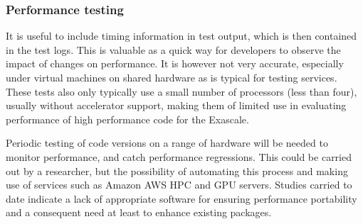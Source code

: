 \subsubsection{Performance testing} \label{sec:perf}

It is useful to include timing information in test output, which is
then contained in the test logs. This is valuable as a quick way for
developers to observe the impact of changes on performance. It is
however not very accurate, especially under virtual machines on shared
hardware as is typical for testing services. These tests also only
typically use a small number of processors (less than four), usually without
accelerator support, making them of limited use in evaluating
performance of high performance code for the Exascale. 

Periodic testing of code versions on a range of hardware will be
needed to monitor performance, and catch performance regressions. This
could be carried out by a researcher, but the possibility of
automating this process and making use of services such as Amazon AWS
HPC and GPU servers. Studies carried to date indicate a lack of appropriate
software for ensuring performance portability and a consequent
need at least to enhance existing packages.


